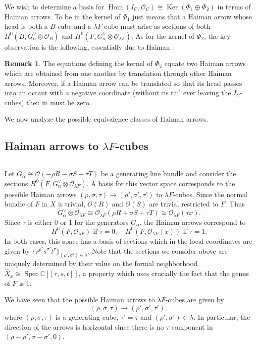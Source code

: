 \documentclass[12pt]{amsart}
\theoremstyle{definition}
\newtheorem{remark}[theorem]{Remark}
\newcommand{\CC} {\mathbb{C}}          %
\renewcommand{\O}{\mathcal{O}}
\newcommand{\Hom}{\operatorname{Hom}}
\newcommand{\Ker}{\operatorname{Ker}}
\newcommand{\Spec}{\operatorname{Spec}}
\renewcommand{\hat}{\widehat}
\newcommand{\SubSecSpace}{$\,$\vspace{0.2cm}\par } %
\begin{document}
We wish to determine a basis for $\Hom (I_{C},\O_{C})\cong \Ker
(\Phi_{1}\oplus \Phi_{2})$ in terms of Haiman arrows. To be in the
kernel of $\Phi_{1}$ just means that a Haiman arrow whose head is both
a $B$-cube and a $\lambda F$-cube must arise as sections of both
$H^{0}(B,G_{\alpha}^{\vee}\otimes \O_{B})$ and
$H^{0}(F,G_{\alpha}^{\vee}\otimes \O_{\lambda F})$. As for the kernel
of $\Phi_{2}$, the key observation is the following, essentially due
to Haiman \cite{Haiman1998}:
\begin{remark}\label{rem: ker of phi2 gives equations equating
translatedarrows} The equations defining the kernel of $\Phi_{2}$
equate two Haiman arrows which are obtained from one another by
translation through other Haiman arrows. Moreover, if a Haiman arrow
can be translated so that its head passes into an octant with a
negative coordinate (without its tail ever leaving the $I_{C}$-cubes)
then in must be zero.
\end{remark}

We now analyze the possible equivalence classes of Haiman arrows.

\subsection{Haiman arrows to $\lambda F$-cubes}
\SubSecSpace 
Let $G_{\alpha}\cong \O (-\rho R-\sigma S-\tau T)$ be a generating
line bundle and consider the sections
$H^{0}(F,G_{\alpha}^{\vee}\otimes \O_{\lambda F})$. A basis for this
vector space corresponds to the possible Haiman arrows $(\rho ,\sigma
,\tau )\to (\rho ',\sigma ',\tau ')$ to $\lambda F$-cubes. Since the
normal bundle of $F$ in $X$ is trivial, $\O (R)$ and $\O (S)$ are
trivial restricted to $F$. Thus
\[
G_{\alpha}^{\vee}\otimes \O_{\lambda F} \cong \O_{\lambda F}(\rho
R+\sigma S+\tau T)\cong \O_{\lambda F}(\tau x).
\]
Since $\tau$ is either 0 or 1 for the generators $G_{\alpha}$, the
Haiman arrows correspond to 
\[
H^{0}(F,\O_{\lambda F})\text{  if  }\tau =0,\quad H^{0}(F,\O_{\lambda
F}(x))\text{  if  }\tau =1.
\]
In both cases, this space has a basis of sections which in the local
coordinates are given by $\{r^{\rho '}s^{\sigma '}t^{\tau } \}_{(\rho
',\sigma ')\in \lambda}$. Note that the sections we consider above are
uniquely determined by their value on the formal neighborhood
$\hat{X}_{x}\cong \Spec \CC [[r,s,t]]$, a property which uses
crucially the fact that the genus of $F$ is 1.

We have seen that the possible Haiman arrows to $\lambda F$-cubes are
given by 
\[
(\rho ,\sigma ,\tau )\to (\rho ',\sigma ',\tau '),
\]
where $(\rho ,\sigma ,\tau )$ is a generating cube, $\tau '=\tau$ and
$(\rho ',\sigma ')\in \lambda$. In particular, the direction of the
arrows is horizontal since there is no $\tau$ component in $(\rho
-\rho ',\sigma -\sigma ',0)$.
\end{document}
